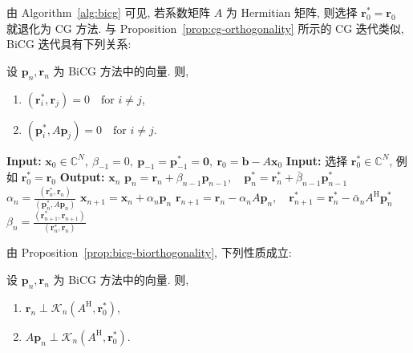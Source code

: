 {由 Algorithm\ \ref{alg:bicg} 可见, 若系数矩阵 $A$ 为 Hermitian 矩阵, 则选择 $\bm r_0^{*}=\bm r_0$ 就退化为 CG 方法.}
{与 Proposition\ \ref{prop:cg-orthogonality} 所示的 CG 迭代类似, BiCG 迭代具有下列关系:}
\par{}
\begin{Proposition}\label{prop:bicg-biorthogonality}
{设 $\bm p_n,\bm r_n$ 为 BiCG 方法中的向量. 则,}
\begin{enumerate}\item $(\bm r_i^{*},\bm r_j)=0\quad\text{for }i\ne j$,\item $(\bm p_i^{*},A\bm p_j)=0\quad\text{for }i\ne j$.\end{enumerate}
\end{Proposition}
\begin{algorithm}[H]\caption{{BiCG 方法}}\label{alg:bicg}\begin{algorithmic}[1]
\Statex\textbf{Input:} $\bm x_0\in\mathbb C^N,\ \beta_{-1}=0,\ \bm p_{-1}=\bm p_{-1}^{*}=\bm0,\ \bm r_0=\bm b-A\bm x_0$
\Statex\textbf{Input:} {选择 $\bm r_0^{*}\in\mathbb C^N$, 例如 $\bm r_0^{*}=\bm r_0$}
\Statex\textbf{Output:} $\bm x_n$
\State $\bm p_n=\bm r_n+\beta_{n-1}\bm p_{n-1},\quad\bm p_n^{*}=\bm r_n^{*}+\bar\beta_{n-1}\bm p_{n-1}^{*}$
\State $\alpha_n=\frac{(\bm r_n^{*},\bm r_n)}{(\bm p_n^{*},A\bm p_n)}$
\State $\bm x_{n+1}=\bm x_n+\alpha_n\bm p_n$
\State $\bm r_{n+1}=\bm r_n-\alpha_nA\bm p_n,\quad\bm r_{n+1}^{*}=\bm r_n^{*}-\bar\alpha_nA^{\mathrm H}\bm p_n^{*}$
\State $\beta_n=\frac{(\bm r_{n+1}^{*},\bm r_{n+1})}{(\bm r_n^{*},\bm r_n)}$
\EndFor\end{algorithmic}\end{algorithm}
{由 Proposition\ \ref{prop:bicg-biorthogonality}, 下列性质成立:}
\par{}
\begin{Corollary}\label{cor:bicg-krylov-orthogonality}
{设 $\bm p_n,\bm r_n$ 为 BiCG 方法中的向量. 则,}
\begin{enumerate}\item $\bm r_n\perp\mathcal K_n(A^{\mathrm H},\bm r_0^{*})$,\item $A\bm p_n\perp\mathcal K_n(A^{\mathrm H},\bm r_0^{*})$.\end{enumerate}
\end{Corollary}
